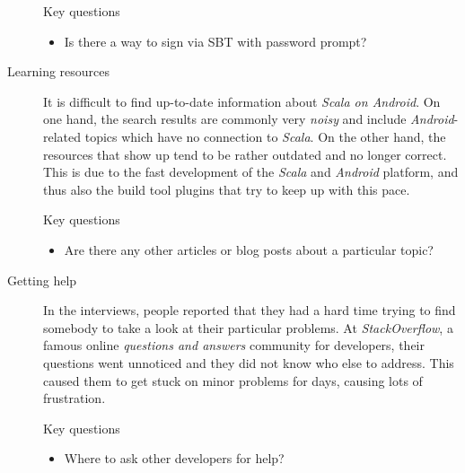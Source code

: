 \begin{description}
\begin{highlight}{Key questions}
\begin{itemize}
			\item Is there a way to sign via \ac{SBT} with password prompt?

		\end{itemize}

	\end{highlight}

	\item[Learning resources]\hfill

	It is difficult to find up-to-date information about \textit{Scala on Android}. On one hand, the search results are commonly very \textit{noisy} and include \textit{Android}-related topics which have no connection to \textit{Scala}. On the other hand, the resources that show up tend to be rather outdated and no longer correct. This is due to the fast development of the \textit{Scala} and \textit{Android} platform, and thus also the build tool plugins that try to keep up with this pace.

	\begin{highlight}{Key questions}

		\begin{itemize}

			\item Are there any other articles or blog posts about a particular topic?

		\end{itemize}

	\end{highlight}

	\item[Getting help]\hfill

	In the interviews, people reported that they had a hard time trying to find somebody to take a look at their particular problems. At \textit{StackOverflow}, a famous online \textit{questions and answers} community for developers, their questions went unnoticed and they did not know who else to address. This caused them to get stuck on minor problems for days, causing lots of frustration.

	\begin{highlight}{Key questions}

		\begin{itemize}

			\item Where to ask other developers for help?

		\end{itemize}

	\end{highlight}

\end{description}

